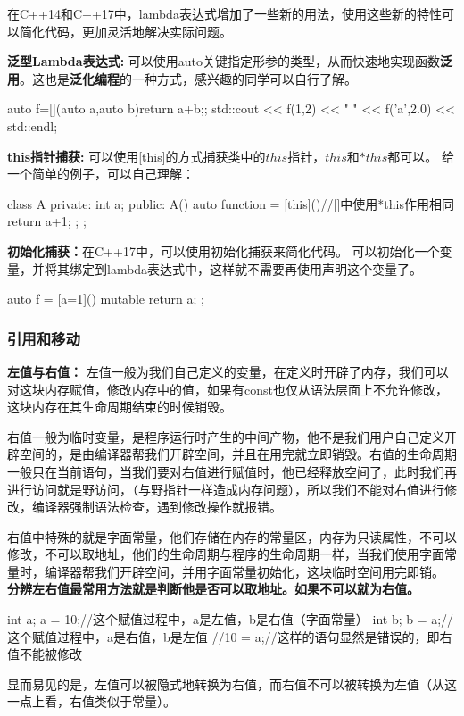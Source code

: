 在C++14和C++17中，lambda表达式增加了一些新的用法，使用这些新的特性可以简化代码，更加灵活地解决实际问题。

\textbf{泛型Lambda表达式:} 
可以使用auto关键指定形参的类型，从而快速地实现函数\textbf{泛用}。这也是\textbf{泛化编程}的一种方式，感兴趣的同学可以自行了解。
\begin{tcode}
auto f=[](auto a,auto b){return a+b;};
std::cout << f(1,2) << " " << f('a',2.0) << std::endl;
\end{tcode}

\textbf{this指针捕获:} 
可以使用[this]的方式捕获类中的$this$指针，$this$和$*this$都可以。
给一个简单的例子，可以自己理解：
\begin{tcode}
class A{
private:
    int a;
public:
    A(){
        auto function = [this](){//[]中使用*this作用相同
            return a+1;
        };
    }
};
\end{tcode}

\textbf{初始化捕获：}在C++17中，可以使用初始化捕获来简化代码。
可以初始化一个变量，并将其绑定到lambda表达式中，这样就不需要再使用声明这个变量了。

\begin{tcode}
auto f = [a=1]() mutable {
    return a;
};
\end{tcode}

\subsubsection{引用和移动}
\textbf{左值与右值：}
左值一般为我们自己定义的变量，在定义时开辟了内存，我们可以对这块内存赋值，修改内存中的值，如果有const也仅从语法层面上不允许修改，这块内存在其生命周期结束的时候销毁。

右值一般为临时变量，是程序运行时产生的中间产物，他不是我们用户自己定义开辟空间的，是由编译器帮我们开辟空间，并且在用完就立即销毁。右值的生命周期一般只在当前语句，当我们要对右值进行赋值时，他已经释放空间了，此时我们再进行访问就是野访问，（与野指针一样造成内存问题），所以我们不能对右值进行修改，编译器强制语法检查，遇到修改操作就报错。

右值中特殊的就是字面常量，他们存储在内存的常量区，内存为只读属性，不可以修改，不可以取地址，他们的生命周期与程序的生命周期一样，当我们使用字面常量时，编译器帮我们开辟空间，并用字面常量初始化，这块临时空间用完即销。
\textbf{分辨左右值最常用方法就是判断他是否可以取地址。如果不可以就为右值。}
\begin{tcode}
int a;
a = 10;//这个赋值过程中，a是左值，b是右值（字面常量）
int b;
b = a;//这个赋值过程中，a是右值，b是左值
//10 = a;//这样的语句显然是错误的，即右值不能被修改
\end{tcode}
显而易见的是，左值可以被隐式地转换为右值，而右值不可以被转换为左值（从这一点上看，右值类似于常量）。

